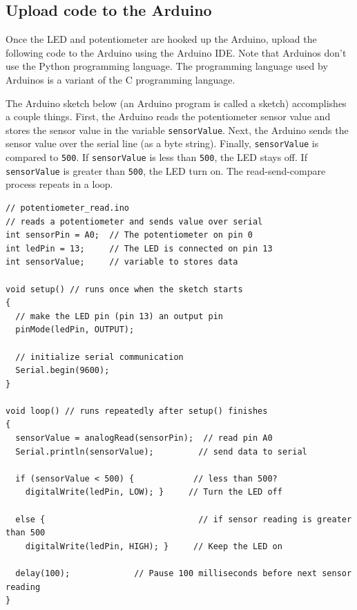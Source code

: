 \documentclass{book}
\begin{document}
        \subsection{Upload code to the
Arduino}\label{upload-code-to-the-arduino}
    




    
        Once the LED and potentiometer are hooked up the Arduino, upload the
following code to the Arduino using the Arduino IDE. Note that Arduinos
don't use the Python programming language. The programming language used
by Arduinos is a variant of the C programming language.

The Arduino sketch below (an Arduino program is called a sketch)
accomplishes a couple things. First, the Arduino reads the potentiometer
sensor value and stores the sensor value in the variable
\lstinline!sensorValue!. Next, the Arduino sends the sensor value over
the serial line (as a byte string). Finally, \lstinline!sensorValue! is
compared to \lstinline!500!. If \lstinline!sensorValue! is less than
\lstinline!500!, the LED stays off. If \lstinline!sensorValue! is
greater than \lstinline!500!, the LED turn on. The read-send-compare
process repeats in a loop.
    




    
        \begin{lstlisting}
// potentiometer_read.ino
// reads a potentiometer and sends value over serial
int sensorPin = A0;  // The potentiometer on pin 0                  
int ledPin = 13;     // The LED is connected on pin 13
int sensorValue;     // variable to stores data

void setup() // runs once when the sketch starts
{
  // make the LED pin (pin 13) an output pin
  pinMode(ledPin, OUTPUT);

  // initialize serial communication
  Serial.begin(9600);
}

void loop() // runs repeatedly after setup() finishes
{
  sensorValue = analogRead(sensorPin);  // read pin A0   
  Serial.println(sensorValue);         // send data to serial
  
  if (sensorValue < 500) {            // less than 500?
    digitalWrite(ledPin, LOW); }     // Turn the LED off
  
  else {                               // if sensor reading is greater than 500
    digitalWrite(ledPin, HIGH); }     // Keep the LED on
  
  delay(100);             // Pause 100 milliseconds before next sensor reading
}
\end{lstlisting}
    
\end{document}

